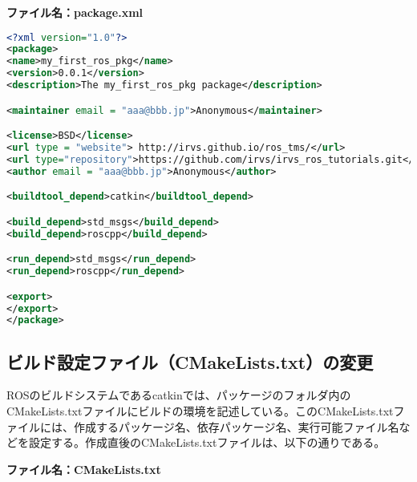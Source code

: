 \noindent\textbf{ファイル名：package.xml}

\begin{lstlisting}[language=XML]
<?xml version="1.0"?>
<package>
<name>my_first_ros_pkg</name>
<version>0.0.1</version>
<description>The my_first_ros_pkg package</description>

<maintainer email = "aaa@bbb.jp">Anonymous</maintainer>

<license>BSD</license>
<url type = "website"> http://irvs.github.io/ros_tms/</url>
<url type="repository">https://github.com/irvs/irvs_ros_tutorials.git</url>
<author email = "aaa@bbb.jp">Anonymous</author>

<buildtool_depend>catkin</buildtool_depend>

<build_depend>std_msgs</build_depend>
<build_depend>roscpp</build_depend>

<run_depend>std_msgs</run_depend>
<run_depend>roscpp</run_depend>

<export>
</export>
</package>
\end{lstlisting}

\subsection{ビルド設定ファイル（CMakeLists.txt）の変更}

ROSのビルドシステムであるcatkinでは、パッケージのフォルダ内のCMakeLists.txtファイルにビルドの環境を記述している。このCMakeLists.txtファイルには、作成するパッケージ名、依存パッケージ名、実行可能ファイル名などを設定する。作成直後のCMakeLists.txtファイルは、以下の通りである。

\noindent\textbf{ファイル名：CMakeLists.txt}

